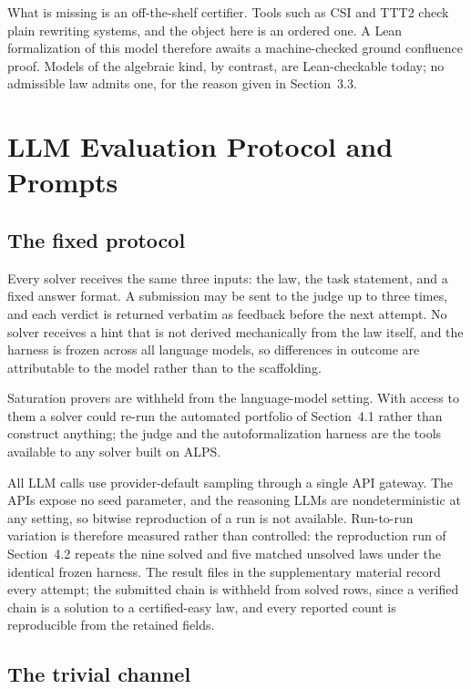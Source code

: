 \documentclass[letterpaper]{article}
\begin{document}
What is missing is an off-the-shelf certifier. Tools such as CSI and TTT2 check
plain rewriting systems, and the object here is an ordered one. A Lean
formalization of this model therefore awaits a machine-checked ground
confluence proof. Models of the algebraic kind, by contrast, are Lean-checkable
today; no admissible law admits one, for the reason given in Section~3.3.


\section{LLM Evaluation Protocol and Prompts}
\label{app:protocol}

\subsection{The fixed protocol}

Every solver receives the same three inputs: the law, the task statement, and a
fixed answer format. A submission may be sent to the judge up to three times,
and each verdict is returned verbatim as feedback before the next attempt. No
solver receives a hint that is not derived mechanically from the law itself,
and the harness is frozen across all language models, so differences in outcome
are attributable to the model rather than to the scaffolding.

Saturation provers are withheld from the language-model setting. With access to
them a solver could re-run the automated portfolio of Section~4.1 rather than
construct anything; the judge and the autoformalization harness are the tools
available to any solver built on ALPS.

All LLM calls use provider-default sampling through a single API gateway. The
APIs expose no seed parameter, and the reasoning LLMs are nondeterministic at
any setting, so bitwise reproduction of a run is not available. Run-to-run
variation is therefore measured rather than controlled: the reproduction run
of Section~4.2 repeats the nine solved and five matched unsolved laws under
the identical frozen harness. The result files in the supplementary material
record every attempt; the submitted chain is withheld from solved rows, since
a verified chain is a solution to a certified-easy law, and every reported
count is reproducible from the retained fields.

\subsection{The trivial channel}
\end{document}
